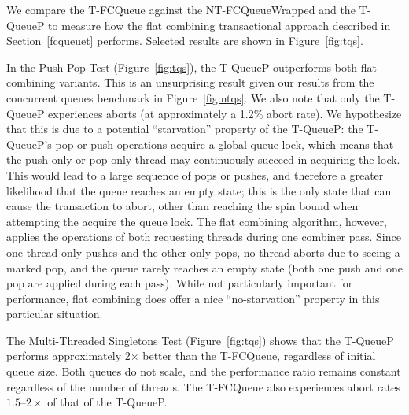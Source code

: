 We compare the T-FCQueue against the NT-FCQueueWrapped and the T-QueueP to measure how the flat combining transactional approach described in Section~\ref{fcqueuet} performs. Selected results are shown in Figure~\ref{fig:tqs}.

In the Push-Pop Test (Figure~\ref{fig:tqs}), the T-QueueP outperforms both flat combining variants. This is an unsurprising result given our results from the concurrent queues benchmark in Figure~\ref{fig:ntqs}. We also note that only the T-QueueP experiences aborts (at approximately a 1.2\% abort rate). We hypothesize that this is due to a potential ``starvation'' property of the T-QueueP: the T-QueueP's pop or push operations acquire a global queue lock, which means that the push-only or pop-only thread may continuously succeed in acquiring the lock. This would lead to a large sequence of pops or pushes, and therefore a greater likelihood that the queue reaches an empty state; this is the only state that can cause the transaction to abort, other than reaching the spin bound when attempting the acquire the queue lock.
The flat combining algorithm, however, applies the operations of both requesting threads during one combiner pass. Since one thread only pushes and the other only pops, no thread aborts due to seeing a marked pop, and the queue rarely reaches an empty state (both one push and one pop are applied during each pass). While not particularly important for performance, flat combining does offer a nice ``no-starvation'' property in this particular situation.

The Multi-Threaded Singletons Test (Figure~\ref{fig:tqs}) shows that the T-QueueP performs approximately 2$\times$ better than the T-FCQueue, regardless of initial queue size. Both queues do not scale, and the performance ratio remains constant regardless of the number of threads. The T-FCQueue also experiences abort rates $1.5$--$2\times$ of that of the T-QueueP.

\vspace{12pt}
\noindent{}

